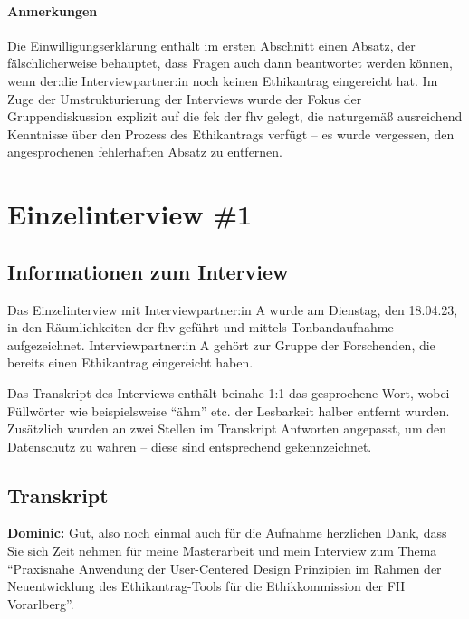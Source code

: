 \documentclass[a4paper,12pt,twoside,numbers=noendperiod]{scrreprt}
\begin{document}
\subsubsection*{Anmerkungen}
\label{appendix:anmerkungen-informed-consent-gruppendiskussion}

Die Einwilligungserklärung enthält im ersten Abschnitt einen Absatz, der fälschlicherweise behauptet, dass Fragen auch dann beantwortet werden können, wenn der:die Interviewpartner:in noch keinen Ethikantrag eingereicht hat. Im Zuge der Umstrukturierung der Interviews wurde der Fokus der Gruppendiskussion explizit auf die \acl{fek} der \acl{fhv} gelegt, die naturgemäß ausreichend Kenntnisse über den Prozess des Ethikantrags verfügt -- es wurde vergessen, den angesprochenen fehlerhaften Absatz zu entfernen.



\cleardoublepage
\chapter{Einzelinterview \#1}
\label{appendix:interview-1}

\section{Informationen zum Interview}
\label{appendix:interview-1-infos}

Das Einzelinterview mit Interviewpartner:in A wurde am Dienstag, den 18.04.23, in den Räumlichkeiten der \ac{fhv} geführt und mittels Tonbandaufnahme aufgezeichnet. Interviewpartner:in A gehört zur Gruppe der Forschenden, die bereits einen Ethikantrag eingereicht haben.

Das Transkript des Interviews enthält beinahe 1:1 das gesprochene Wort, wobei Füllwörter wie beispielsweise \enquote{ähm} etc. der Lesbarkeit halber entfernt wurden. Zusätzlich wurden an zwei Stellen im Transkript Antworten angepasst, um den Datenschutz zu wahren -- diese sind entsprechend gekennzeichnet.

\section{Transkript}
\label{appendix:interview-1-transkript}

\textbf{Dominic:} Gut, also noch einmal auch für die Aufnahme herzlichen Dank, dass Sie sich Zeit nehmen für meine Masterarbeit und mein Interview zum Thema \enquote{Praxisnahe Anwendung der User-Centered Design Prinzipien im Rahmen der Neuentwicklung des Ethikantrag-Tools für die Ethikkommission der FH Vorarlberg}.
\end{document}
